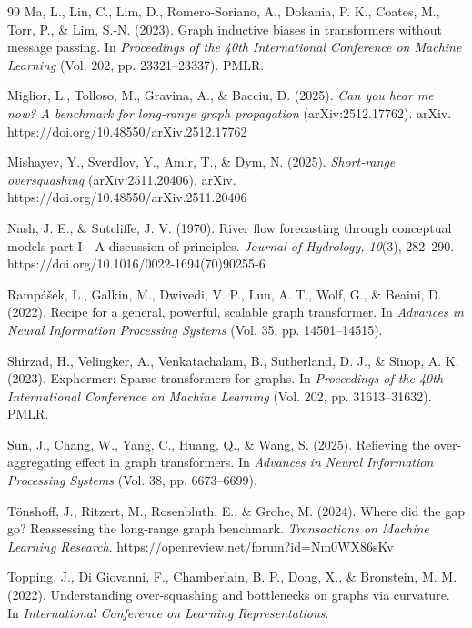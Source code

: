 \begin{thebibliography}{99}
Ma, L., Lin, C., Lim, D., Romero-Soriano, A., Dokania, P. K., Coates, M., Torr, P., \& Lim, S.-N. (2023). Graph inductive biases in transformers without message passing. In \emph{Proceedings of the 40th International Conference on Machine Learning} (Vol. 202, pp. 23321--23337). PMLR.

Miglior, L., Tolloso, M., Gravina, A., \& Bacciu, D. (2025). \emph{Can you hear me now? A benchmark for long-range graph propagation} (arXiv:2512.17762). arXiv. https://doi.org/10.48550/arXiv.2512.17762

Mishayev, Y., Sverdlov, Y., Amir, T., \& Dym, N. (2025). \emph{Short-range oversquashing} (arXiv:2511.20406). arXiv. https://doi.org/10.48550/arXiv.2511.20406

Nash, J. E., \& Sutcliffe, J. V. (1970). River flow forecasting through conceptual models part I---A discussion of principles. \emph{Journal of Hydrology, 10}(3), 282--290. https://doi.org/10.1016/0022-1694(70)90255-6

Ramp\'{a}\v{s}ek, L., Galkin, M., Dwivedi, V. P., Luu, A. T., Wolf, G., \& Beaini, D. (2022). Recipe for a general, powerful, scalable graph transformer. In \emph{Advances in Neural Information Processing Systems} (Vol. 35, pp. 14501--14515).

Shirzad, H., Velingker, A., Venkatachalam, B., Sutherland, D. J., \& Sinop, A. K. (2023). Exphormer: Sparse transformers for graphs. In \emph{Proceedings of the 40th International Conference on Machine Learning} (Vol. 202, pp. 31613--31632). PMLR.

Sun, J., Chang, W., Yang, C., Huang, Q., \& Wang, S. (2025). Relieving the over-aggregating effect in graph transformers. In \emph{Advances in Neural Information Processing Systems} (Vol. 38, pp. 6673--6699).

T\"{o}nshoff, J., Ritzert, M., Rosenbluth, E., \& Grohe, M. (2024). Where did the gap go? Reassessing the long-range graph benchmark. \emph{Transactions on Machine Learning Research}. https://openreview.net/forum?id=Nm0WX86sKv

Topping, J., Di Giovanni, F., Chamberlain, B. P., Dong, X., \& Bronstein, M. M. (2022). Understanding over-squashing and bottlenecks on graphs via curvature. In \emph{International Conference on Learning Representations}.


\end{thebibliography}
